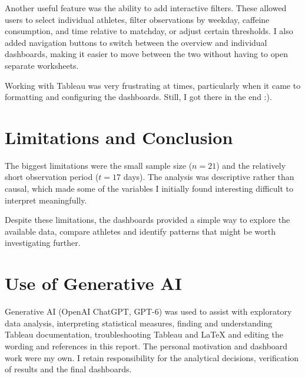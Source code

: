 \documentclass[11pt,a4paper]{article}
\begin{document}
Another useful feature was the ability to add interactive filters. These allowed users to select individual athletes, filter observations by weekday, caffeine consumption, and time relative to matchday, or adjust certain thresholds. I also added navigation buttons to switch between the overview and individual dashboards, making it easier to move between the two without having to open separate worksheets.

Working with Tableau was very frustrating at times, particularly when it came to formatting and configuring the dashboards. Still, I got there in the end :).


\section{Limitations and Conclusion}
\label{sec:limitations}

The biggest limitations were the small sample size ($n = 21$) and the relatively short observation period ($t = 17$ days). The analysis was descriptive rather than causal, which made some of the variables I initially found interesting difficult to interpret meaningfully.

Despite these limitations, the dashboards provided a simple way to explore the available data, compare athletes and identify patterns that might be worth investigating further.

\section{Use of Generative AI}
\label{sec:ai}

Generative AI (OpenAI ChatGPT, GPT-6) was used to assist with exploratory data analysis, interpreting statistical measures, finding and understanding Tableau documentation, troubleshooting Tableau and LaTeX and editing the wording and references in this report. The personal motivation and dashboard work were my own. I retain responsibility for the analytical decisions, verification of results and the final dashboards.
\end{document}
